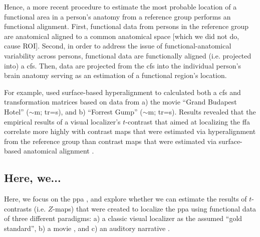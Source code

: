 

%
Hence, a more recent procedure \citep[e.g., ][]{jiahui2020predicting,
guntupalli2016model, haxby2011common} to estimate the most probable location of
a functional area in a person's anatomy from a reference group performs an
functional alignment.
First, functional data from persons in the reference group are anatomical
aligned to a common anatomical space [which we did not do, cause ROI].
%
Second, in order to address the issue of functional-anatomical variability
across persons, functional data are functionally aligned (i.e. projected into) a
\ac{cfs}.
%
Then, data are projected from the \ac{cfs} into the individual person's brain
anatomy serving as an estimation of a functional region's location.

For example, \citet{jiahui2020predicting} used surface-based hyperalignment to
calculated both a \ac{cfs} and transformation matrices based on data from a) the
movie ``Grand Budapest Hotel'' ($\sim$\unit[50]{m}; \ac{tr}=\unit[1]{s}), and b)
``Forrest Gump'' ($\sim$\unit[120]{m}; \ac{tr}=\unit[2]{s}).
Results revealed that the empirical results of a visual localizer's $t$-contrast
that aimed at localizing the \ac{ffa} correlate more highly with contrast maps
that were estimated via hyperalignment from the reference group than contrast
maps that were estimated via surface-based anatomical alignment
\citep{jiahui2020predicting}.


\subsection{Here, we...}



Here, we focus on the \ac{ppa} \citep[e.g.,][for reviews]{epstein2014neural,
aminoff2013role}, and explore whether we can estimate the results of
$t$-contrasts (i.e. $Z$-maps) that were created to localize the \ac{ppa} using
functional data of three different paradigms:
%
a) a classic visual localizer \citep{sengupta2016extension} as the assumed
``gold standard'',
%
b) a movie \citep{haeusler2022processing}, and
%
c) an auditory narrative \citep{haeusler2022processing}.


